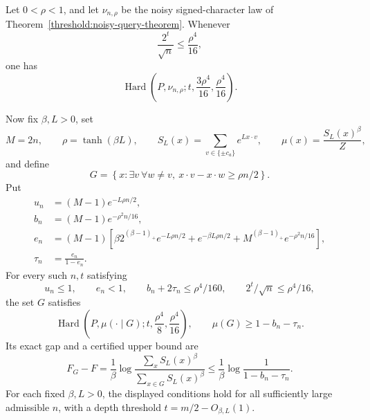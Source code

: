 \begin{proposition}
\label{ian:hard-sector-soft-instance}
Let \(0<\rho<1\), and let \(\nu_{n,\rho}\) be the noisy signed-character
law of Theorem~\ref{threshold:noisy-query-theorem}. Whenever
\[
 \frac{2^t}{\sqrt n}\le\frac{\rho^4}{16},
\]
one has
\[
 \operatorname{Hard}\left(
 P,\nu_{n,\rho};
 t,\frac{3\rho^4}{16},\frac{\rho^4}{16}\right).
\]

Now fix \(\beta,L>0\), set
\[
 M=2n,\qquad \rho=\tanh(\beta L),\qquad
 S_L(x)=\sum_{v\in\{\pm c_a\}}e^{Lx\cdot v},
 \qquad \mu(x)=\frac{S_L(x)^\beta}{Z},
\]
and define
\[
 G=\left\{x:\exists v\ \forall w\ne v,\
 x\cdot v-x\cdot w\ge\rho n/2\right\}.
\]
Put
\[
 \begin{split}
 u_n&=(M-1)e^{-L\rho n/2},\\
 b_n&=(M-1)e^{-\rho^2n/16},\\
 e_n&=(M-1)\left[
 \beta2^{(\beta-1)_+}e^{-L\rho n/2}
 +e^{-\beta L\rho n/2}
 +M^{(\beta-1)_+}e^{-\rho^2n/16}\right],\\
 \tau_n&=\frac{e_n}{1-e_n}.
 \end{split}
\]
For every such \(n,t\) satisfying
\[
 u_n\le1,\qquad e_n<1,\qquad
 b_n+2\tau_n\le\rho^4/160,\qquad
 2^t/\sqrt n\le\rho^4/16,
\]
the set \(G\) satisfies
\[
 \operatorname{Hard}\left(
 P,\mu(\cdot\mid G);
 t,\frac{\rho^4}{8},\frac{\rho^4}{16}\right),
 \qquad \mu(G)\ge1-b_n-\tau_n.
\]
Its exact gap and a certified upper bound are
\[
 F_G-F
 =\frac1\beta\log
 \frac{\sum_xS_L(x)^\beta}{\sum_{x\in G}S_L(x)^\beta}
 \le\frac1\beta\log\frac1{1-b_n-\tau_n}.
\]
For each fixed \(\beta,L>0\), the displayed conditions hold for all
sufficiently large admissible \(n\), with a depth threshold
\(t=m/2-O_{\beta,L}(1)\).
\end{proposition}


